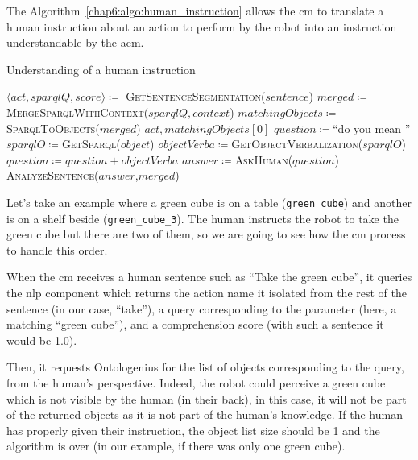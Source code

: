 \documentclass[a4paper,11pt,twoside]{StyleThese}
\begin{document}
The Algorithm~\ref{chap6:algo:human_instruction} allows the \acrshort{cm} to translate a human instruction about an action to perform by the robot into an instruction understandable by the \acrlong{aem}. 

\begin{algorithm}[!htb]
	\caption{Understanding of a human instruction}
	\label{chap6:algo:human_instruction}
	\begin{algorithmic}
		\State $\langle act, sparqlQ, score \rangle \coloneqq$ \textsc{GetSentenceSegmentation($sentence$)} 
		\State $merged \coloneqq$\textsc{MergeSparqlWithContext}($sparqlQ,context$)
		\State $matchingObjects \coloneqq$ \textsc{SparqlToObjects}($merged$)
		\State \Return $act,matchingObjects[0]$
		\Else
		\State $question \coloneqq$``do you mean ''
		\State $sparqlO \coloneqq$\textsc{GetSparql($object$)}
		\State $objectVerba \coloneqq$\textsc{GetObjectVerbalization($sparqlO$)}
		\State $question \coloneqq question + objectVerba$
		\EndFor
		\State $answer \coloneqq$\textsc{AskHuman}($question$)
		\State \textsc{AnalyzeSentence}($answer$,$merged$)
		\EndIf
		\EndIf
		\EndFunction
	\end{algorithmic}
\end{algorithm}		

Let's take an example where a green cube is on a table (\verb'green_cube') and another is on a shelf beside (\verb'green_cube_3'). The human instructs the robot to take the green cube but there are two of them, so we are going to see how the \acrshort{cm} process to handle this order. 

When the \acrshort{cm} receives a human sentence such as ``Take the green cube'', it queries the \acrfull{nlp} component which returns the action name it isolated from the rest of the sentence (\eg in our case, ``take''), a \sparql{} query corresponding to the parameter (\eg here, a \sparql{} matching ``green cube''), and a comprehension score (\eg with such a sentence it would be 1.0). 

Then, it requests Ontologenius for the list of objects corresponding to the \sparql{} query, from the human's perspective. Indeed, the robot could perceive a green cube which is not visible by the human (\eg in their back), in this case, it will not be part of the returned objects as it is not part of the human's knowledge. If the human has properly given their instruction, the object list size should be 1 and the algorithm is over (\eg in our example, if there was only one green cube). 
\end{document}
